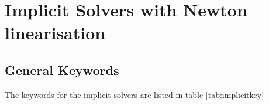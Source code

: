 \documentclass[a4paper,10pt]{report}
\begin{document}
\chapter{Implicit Solvers with Newton linearisation}
\section{General Keywords}
The keywords for the implicit solvers are listed in table \ref{tab:implicitkey}

\end{document}
